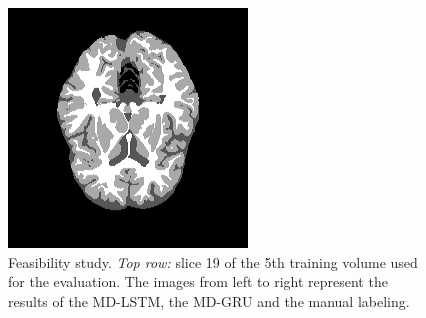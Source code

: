 \documentclass[varwidth=true, border=10pt, convert={size=640x}]{standalone}
\begin{document}
\begin{figure}
\begin{minipage}{.24\textwidth}
  \end{minipage}
  \begin{minipage}{.24\textwidth}
 \includegraphics[width=.98\linewidth]{./images/Traindata5atslice19-Testlabel.png}
  \end{minipage}

  \caption{Feasibility study. \emph{Top row:} slice 19 of the 5th training volume used for the evaluation. The images from left to right represent the results of the MD-LSTM, the MD-GRU and the manual labeling.}
\label{feasibilityqualitative}

\end{figure}
\end{document}
